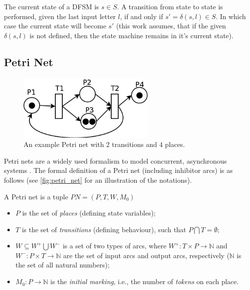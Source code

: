 The current state of a DFSM is \(s \in S\). A transition from state to state is performed, given the last input letter \(l\), if and only if \( s' = \delta(s, l) \in S \). In which case the current state will become \(s'\) (this work assumes, that if the given \(\delta(s, l)\) is not defined, then the state machine remains in it's current state).

\subsection{Petri Net}

\begin{figure}[!ht]
	\centering
	\includegraphics[width=67mm, keepaspectratio]{figures/petri_net.png}\hspace{1cm}
	\caption{An example Petri net with 2 transitions and 4 places.}
	\label{fig:petri_net}
\end{figure}

Petri nets are a widely used formalism to model concurrent, asynchronous systems \cite{24143}. The formal definition of a Petri net (including inhibitor arcs) is as follows (see \autoref{fig:petri_net} for an illustration of the notations).

\begin{definition}
	
	A Petri net is a tuple \( PN = (P, T, W, M_0) \)
	
	\begin{itemize}
		\item \(P\) is the set of \emph{places} (defining state variables);
		\item \(T\) is the set of \emph{transitions} (defining behaviour), such that \( P \bigcap T = \emptyset \);
		\item \(W \subseteq W^+ \bigcup W^- \) is a set of two types of arcs, where \(  W^+ : T \times P \rightarrow \mathbb{N}\) and \( W^- : P \times T \rightarrow \mathbb{N} \) are the set of input arcs and output arcs, respectively (\( \mathbb{N} \) is the set of all natural numbers);
		\item \(M_0 : P \rightarrow \mathbb{N} \) is the \emph{initial marking}, i.e., the number of \emph{tokens} on each place.
	\end{itemize}
\end{definition}

